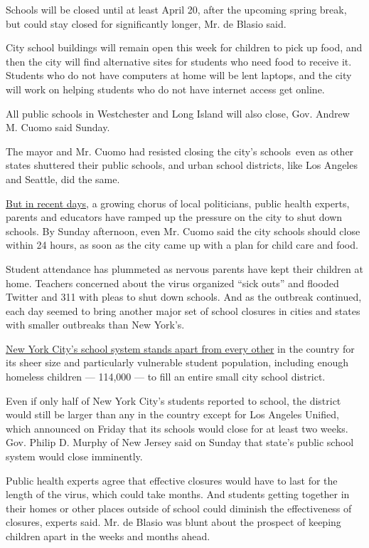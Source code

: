 Schools will be closed until at least April 20, after the upcoming
spring break, but could stay closed for significantly longer, Mr. de
Blasio said.

City school buildings will remain open this week for children to pick up
food, and then the city will find alternative sites for students who
need food to receive it. Students who do not have computers at home will
be lent laptops, and the city will work on helping students who do not
have internet access get online.

All public schools in Westchester and Long Island will also close, Gov.
Andrew M. Cuomo said Sunday.

The mayor and Mr. Cuomo had resisted closing the city's schools~even as
other states shuttered their public schools, and urban school districts,
like Los Angeles and Seattle, did the same.

\href{https://www.nytimes.com/2020/03/13/nyregion/coronavirus-nyc-schools.html}{But
in recent days}, a growing chorus of local politicians, public health
experts, parents and educators have ramped up the pressure on the city
to shut down schools. By Sunday afternoon, even Mr. Cuomo said the city
schools should close within 24 hours, as soon as the city came up with a
plan for child care and food.

Student attendance has plummeted as nervous parents have kept their
children at home. Teachers concerned about the virus organized ``sick
outs'' and flooded Twitter and 311 with pleas to shut down schools. And
as the outbreak continued, each day seemed to bring another major set of
school closures in cities and states with smaller outbreaks than New
York's.

\href{https://www.nytimes.com/2020/03/07/nyregion/nyc-schools-coronavirus.html}{New
York City's school system stands apart from every other} in the country
for its sheer size and particularly vulnerable student population,
including enough homeless children --- 114,000 --- to fill an entire
small city school district.

Even if only half of New York City's students reported to school, the
district would still be larger than any in the country except for Los
Angeles Unified, which announced on Friday that its schools would close
for at least two weeks. Gov. Philip D. Murphy of New Jersey said on
Sunday that state's public school system would close imminently.

Public health experts agree that effective closures would have to last
for the length of the virus, which could take months. And students
getting together in their homes or other places outside of school could
diminish the effectiveness of closures, experts said. Mr. de Blasio was
blunt about the prospect of keeping children apart in the weeks and
months ahead.

